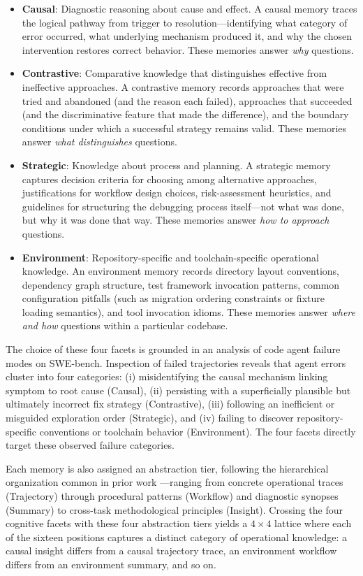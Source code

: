 \documentclass[letterpaper]{article} %
\begin{document}
\begin{itemize}
    \item \textbf{Causal}: Diagnostic reasoning about cause and effect. A causal memory traces the logical pathway from trigger to resolution---identifying what category of error occurred, what underlying mechanism produced it, and why the chosen intervention restores correct behavior. These memories answer \emph{why} questions.
    \item \textbf{Contrastive}: Comparative knowledge that distinguishes effective from ineffective approaches. A contrastive memory records approaches that were tried and abandoned (and the reason each failed), approaches that succeeded (and the discriminative feature that made the difference), and the boundary conditions under which a successful strategy remains valid. These memories answer \emph{what distinguishes} questions.
    \item \textbf{Strategic}: Knowledge about process and planning. A strategic memory captures decision criteria for choosing among alternative approaches, justifications for workflow design choices, risk-assessment heuristics, and guidelines for structuring the debugging process itself---not what was done, but why it was done that way. These memories answer \emph{how to approach} questions.
    \item \textbf{Environment}: Repository-specific and toolchain-specific operational knowledge. An environment memory records directory layout conventions, dependency graph structure, test framework invocation patterns, common configuration pitfalls (such as migration ordering constraints or fixture loading semantics), and tool invocation idioms. These memories answer \emph{where and how} questions within a particular codebase.
\end{itemize}

The choice of these four facets is grounded in an analysis of code agent failure modes on SWE-bench. Inspection of failed trajectories reveals that agent errors cluster into four categories: (i) misidentifying the causal mechanism linking symptom to root cause (Causal), (ii) persisting with a superficially plausible but ultimately incorrect fix strategy (Contrastive), (iii) following an inefficient or misguided exploration order (Strategic), and (iv) failing to discover repository-specific conventions or toolchain behavior (Environment). The four facets directly target these observed failure categories.

Each memory is also assigned an abstraction tier, following the hierarchical organization common in prior work \cite{g-memory, evolve-mem, h-mem}---ranging from concrete operational traces (Trajectory) through procedural patterns (Workflow) and diagnostic synopses (Summary) to cross-task methodological principles (Insight). Crossing the four cognitive facets with these four abstraction tiers yields a $4 \times 4$ lattice where each of the sixteen positions captures a distinct category of operational knowledge: a causal insight differs from a causal trajectory trace, an environment workflow differs from an environment summary, and so on.
\end{document}
